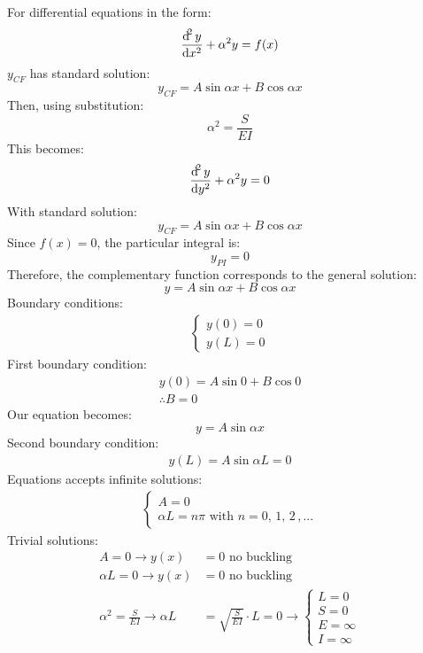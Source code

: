 \documentclass[class=report, crop=false, 12pt,a4paper]{standalone}
\begin{document}
For differential equations in the form:
\begin{equation}
    \frac{\dif^2 y}{\dif x^2}+ \alpha^2 y = f(x)
\end{equation}
$y_{CF}$ has standard solution:
\begin{equation}
    y_{CF} = A\sin{\alpha x} + B\cos{\alpha x}
\end{equation}
Then, using substitution:
\begin{equation}
    \alpha^2 = \frac{S}{EI}
\end{equation}
This becomes:
\begin{equation}
    \frac{\dif^2 y}{\dif y^2} + \alpha^2 y = 0
\end{equation}
With standard solution:
\begin{equation}
    y_{CF} = A\sin{\alpha x} + B\cos{\alpha x}
\end{equation}
Since $f(x) = 0$, the particular integral is:
\begin{equation}
    y_{PI} = 0
\end{equation}
Therefore, the complementary function corresponds to the general solution:
\begin{equation}
    y = A\sin{\alpha x} + B\cos{\alpha x}
\end{equation}
Boundary conditions:
\begin{gather}
    \begin{cases}
        y(0) = 0\\
        y(L) = 0
    \end{cases}
\end{gather}
First boundary condition:
\begin{gather}
    y(0) = A\sin 0 + B\cos 0\\
    \therefore B = 0
\end{gather}
Our equation becomes:
\begin{equation}
    y = A\sin{\alpha x}
\end{equation}
Second boundary condition:
\begin{gather}
    y(L) = A\sin{\alpha L} = 0
\end{gather}
Equations accepts infinite solutions:
\begin{align}
    \begin{cases}
        A = 0\\
        \alpha L = n\pi \textrm{ with } n = 0,\, 1 ,\, 2\, , ...
    \end{cases}
\end{align}
Trivial solutions:
\begin{align}
    A = 0 \rightarrow y(x) &= 0 \textrm{ no buckling}\\
    \alpha L = 0 \rightarrow y(x) & = 0 \textrm{ no buckling}\\
    \alpha^2 = \frac{S}{EI} \rightarrow \alpha L &= \sqrt{\frac{S}{EI}}\cdot L = 0 \rightarrow \begin{cases}
        L = 0\\
        S = 0\\
        E = \infty\\
        I = \infty
    \end{cases}
\end{align}
\end{document}
